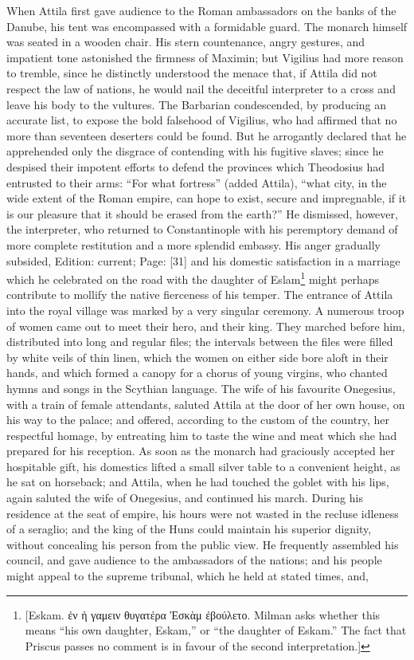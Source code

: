 When Attila first gave audience to the Roman ambassadors on the banks of the Danube, his tent was encompassed with a formidable guard. The monarch himself was seated in a wooden chair. His stern countenance, angry gestures, and impatient tone astonished the firmness of Maximin; but Vigilius had more reason to tremble, since he distinctly understood the menace that, if Attila did not respect the law of nations, he would nail the deceitful interpreter to a cross and leave his body to the vultures. The Barbarian condescended, by producing an accurate list, to expose the bold falsehood of Vigilius, who had affirmed that no more than seventeen deserters could be found. But he arrogantly declared that he apprehended only the disgrace of contending with his fugitive slaves; since he despised their impotent efforts to defend the provinces which Theodosius had entrusted to their arms: \texthebrew{“}For what fortress\texthebrew{}” (added Attila), \texthebrew{“}what city, in the wide extent of the Roman empire, can hope to exist, secure and impregnable, if it is our pleasure that it should be erased from the earth?\texthebrew{}” He dismissed, however, the interpreter, who returned to Constantinople with his peremptory demand of more complete restitution and a more splendid embassy. His anger gradually subsided, Edition: current; Page: [31] and his domestic satisfaction in a marriage which he celebrated on the road with the daughter of Eslam\footnote{[Eskam. \textgreek{\texthebrew{ἐ}ν \texthebrew{ἠ} γαμειν θυγατέρα \texthebrew{Ἐ}σκ\texthebrew{ὰ}μ \texthebrew{ἐ}βούλετο}. Milman asks whether this means \texthebrew{“}his own daughter, Eskam,\texthebrew{}” or \texthebrew{“}the daughter of Eskam.\texthebrew{}” The fact that Priscus passes no comment is in favour of the second interpretation.]} might perhaps contribute to mollify the native fierceness of his temper. The entrance of Attila into the royal village was marked by a very singular ceremony. A numerous troop of women came out to meet their hero, and their king. They marched before him, distributed into long and regular files; the intervals between the files were filled by white veils of thin linen, which the women on either side bore aloft in their hands, and which formed a canopy for a chorus of young virgins, who chanted hymns and songs in the Scythian language. The wife of his favourite Onegesius, with a train of female attendants, saluted Attila at the door of her own house, on his way to the palace; and offered, according to the custom of the country, her respectful homage, by entreating him to taste the wine and meat which she had prepared for his reception. As soon as the monarch had graciously accepted her hospitable gift, his domestics lifted a small silver table to a convenient height, as he sat on horseback; and Attila, when he had touched the goblet with his lips, again saluted the wife of Onegesius, and continued his march. During his residence at the seat of empire, his hours were not wasted in the recluse idleness of a seraglio; and the king of the Huns could maintain his superior dignity, without concealing his person from the public view. He frequently assembled his council, and gave audience to the ambassadors of the nations; and his people might appeal to the supreme tribunal, which he held at stated times, and, 